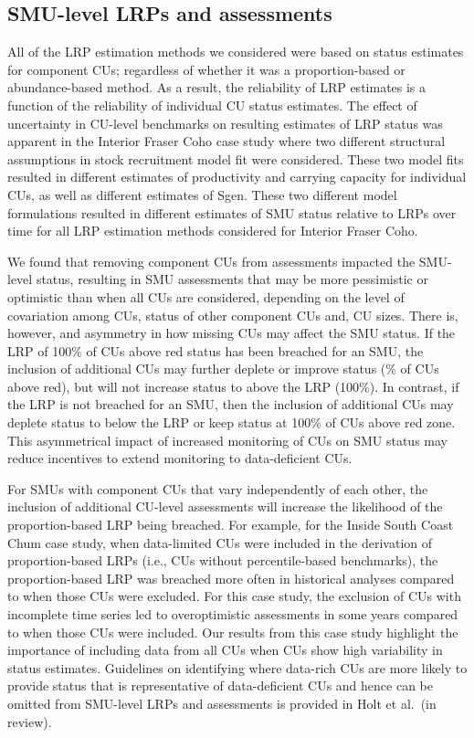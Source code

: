 \documentclass[11pt]{book}
\begin{document}
\hypertarget{smu-level-lrps-and-assessments}{%
\subsection{SMU-level LRPs and assessments}\label{smu-level-lrps-and-assessments}}

All of the LRP estimation methods we considered were based on status estimates for component CUs; regardless of whether it was a proportion-based or abundance-based method. As a result, the reliability of LRP estimates is a function of the reliability of individual CU status estimates. The effect of uncertainty in CU-level benchmarks on resulting estimates of LRP status was apparent in the Interior Fraser Coho case study where two different structural assumptions in stock recruitment model fit were considered. These two model fits resulted in different estimates of productivity and carrying capacity for individual CUs, as well as different estimates of Sgen. These two different model formulations resulted in different estimates of SMU status relative to LRPs over time for all LRP estimation methods considered for Interior Fraser Coho.

We found that removing component CUs from assessments impacted the SMU-level status, resulting in SMU assessments that may be more pessimistic or optimistic than when all CUs are considered, depending on the level of covariation among CUs, status of other component CUs and, CU sizes. There is, however, and asymmetry in how missing CUs may affect the SMU status. If the LRP of 100\% of CUs above red status has been breached for an SMU, the inclusion of additional CUs may further deplete or improve status (\% of CUs above red), but will not increase status to above the LRP (100\%). In contrast, if the LRP is not breached for an SMU, then the inclusion of additional CUs may deplete status to below the LRP or keep status at 100\% of CUs above red zone. This asymmetrical impact of increased monitoring of CUs on SMU status may reduce incentives to extend monitoring to data-deficient CUs.

For SMUs with component CUs that vary independently of each other, the inclusion of additional CU-level assessments will increase the likelihood of the proportion-based LRP being breached. For example, for the Inside South Coast Chum case study, when data-limited CUs were included in the derivation of proportion-based LRPs (i.e., CUs without percentile-based benchmarks), the proportion-based LRP was breached more often in historical analyses compared to when those CUs were excluded. For this case study, the exclusion of CUs with incomplete time series led to overoptimistic assessments in some years compared to when those CUs were included. Our results from this case study highlight the importance of including data from all CUs when CUs show high variability in status estimates. Guidelines on identifying where data-rich CUs are more likely to provide status that is representative of data-deficient CUs and hence can be omitted from SMU-level LRPs and assessments is provided in Holt et al.~(in review).
\end{document}
